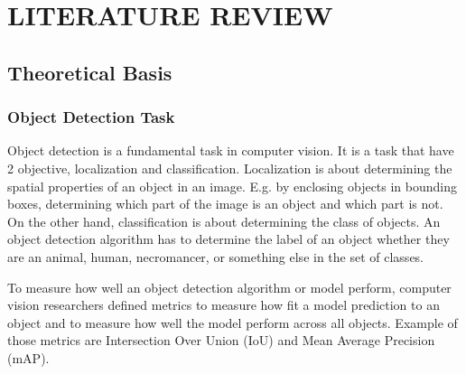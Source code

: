 \chapter{LITERATURE REVIEW}
\section{Theoretical Basis}
  \subsection{Object Detection Task}

  Object detection is a fundamental task in computer vision.
  It is a task that have 2 objective, localization and classification.
  Localization is about determining the spatial properties of an object in an image. E.g. by
  enclosing objects in bounding boxes, determining which part of the image is an object and which part is not. 
  On the other hand, classification is about determining the class of
  objects. An object detection algorithm has to determine the label of an object whether
  they are an animal, human, necromancer, or something else in the set of classes.

  To measure how well an object detection algorithm or model perform, computer vision
  researchers defined metrics to measure how fit a model prediction to an object
  and to measure how well the model perform across all objects. Example of those metrics are Intersection Over Union (IoU) and Mean Average Precision (mAP).
  



